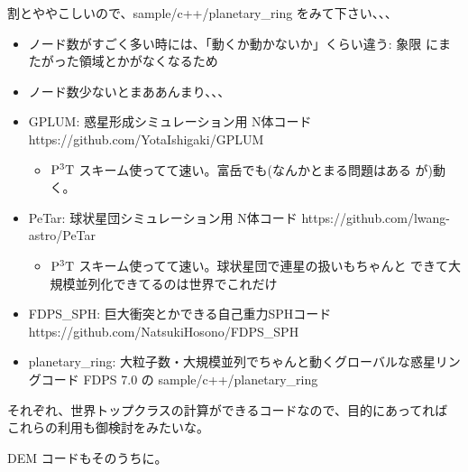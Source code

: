 \documentclass[12pt,dvipdfmx]{article}
\begin{document}

割とややこしいので、sample/c++/planetary\_ring をみて下さい、、、


\begin{itemize}

\item ノード数がすごく多い時には、「動くか動かないか」くらい違う: 象限
にまたがった領域とかがなくなるため

\item ノード数少ないとまああんまり、、、

\end{itemize}




\begin{itemize}

\item GPLUM: 惑星形成シミュレーション用 N体コード
https://github.com/YotaIshigaki/GPLUM
\begin{itemize}
\item $\rm P^3T$ スキーム使ってて速い。富岳でも(なんかとまる問題はある
が)動く。
\end{itemize}
\item PeTar: 球状星団シミュレーション用 N体コード
https://github.com/lwang-astro/PeTar
\begin{itemize}
\item $\rm P^3T$ スキーム使ってて速い。球状星団で連星の扱いもちゃんと
できて大規模並列化できてるのは世界でこれだけ
\end{itemize}
\item FDPS\_SPH: 巨大衝突とかできる自己重力SPHコード
https://github.com/NatsukiHosono/FDPS\_SPH

\item planetary\_ring: 大粒子数・大規模並列でちゃんと動くグローバルな惑星リングコード
FDPS 7.0 の sample/c++/planetary\_ring

\end{itemize}

それぞれ、世界トップクラスの計算ができるコードなので、目的にあってれば
これらの利用も御検討をみたいな。

DEM コードもそのうちに。
\end{document}
